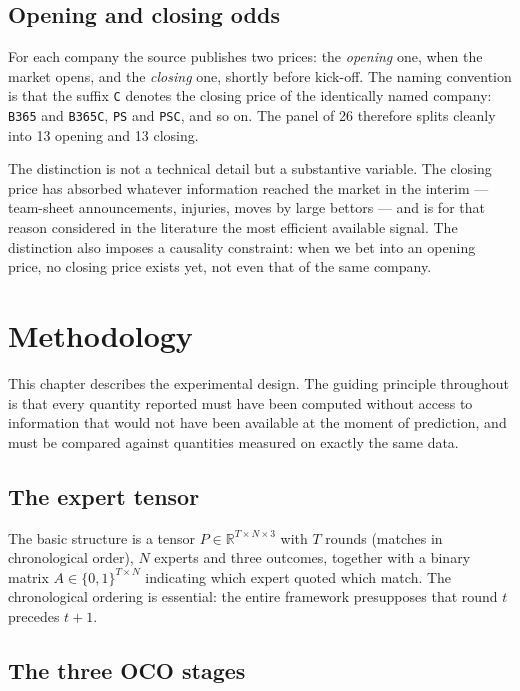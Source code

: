 \documentclass[12pt,a4paper,oneside]{report}
\newcommand{\file}[1]{\texttt{#1}}
\renewcommand{\_}{\oldunderscore\allowbreak}
\theoremstyle{definition}
\theoremstyle{plain}
\theoremstyle{remark}
\begin{document}
\section{Opening and closing odds}
\label{sec:openclose}

For each company the source publishes two prices: the \emph{opening} one, when the market opens,
and the \emph{closing} one, shortly before kick-off. The naming convention is that the suffix
\file{C} denotes the closing price of the identically named company: \file{B365} and
\file{B365C}, \file{PS} and \file{PSC}, and so on. The panel of 26 therefore splits cleanly into
13 opening and 13 closing.

The distinction is not a technical detail but a substantive variable. The closing price has
absorbed whatever information reached the market in the interim --- team-sheet announcements,
injuries, moves by large bettors --- and is for that reason considered in the literature the most
efficient available signal. The distinction also imposes a causality constraint: when we bet into
an opening price, no closing price exists yet, not even that of the same company.

\chapter{Methodology}
\label{ch:method}

This chapter describes the experimental design. The guiding principle throughout is that every
quantity reported must have been computed without access to information that would not have been
available at the moment of prediction, and must be compared against quantities measured on
exactly the same data.

\section{The expert tensor}

The basic structure is a tensor $P \in \mathbb{R}^{T \times N \times 3}$ with $T$ rounds
(matches in chronological order), $N$ experts and three outcomes, together with a binary matrix
$A \in \{0,1\}^{T \times N}$ indicating which expert quoted which match. The chronological
ordering is essential: the entire framework presupposes that round $t$ precedes $t+1$.

\section{The three OCO stages}
\end{document}
